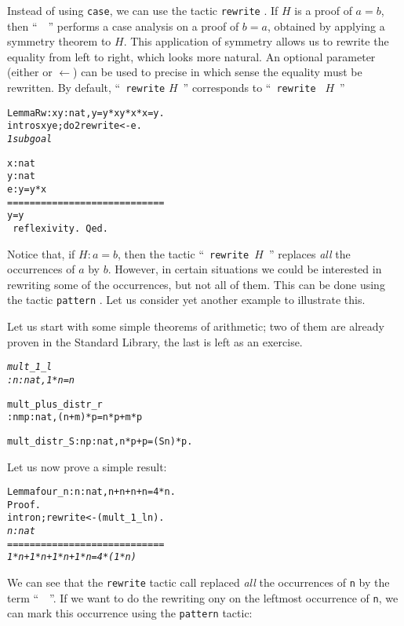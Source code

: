 \documentclass[11pt]{article}
\newcommand{\refmancite}[1]{{}}
\begin{document}
Instead of using \texttt{case}, we can use the tactic 
\texttt{rewrite} \refmancite{Section \ref{Rewrite}}.  If $H$ is a proof
of  $a=b$, then
``~~''
 performs a case analysis on a proof of $b=a$, obtained by applying a
symmetry theorem to $H$. This application of symmetry allows us to rewrite
the equality from left to right, which looks more natural. An optional
parameter (either \texttt{\arrow{}} or \texttt{$\leftarrow$}) can be used to precise
in which sense the equality must be rewritten.  By default,
``~\texttt{rewrite} $H$~'' corresponds to ``~\texttt{rewrite \arrow{}} $H$~''
\begin{alltt}
Lemma Rw :  {\prodsym} x y: nat, y = y * x {\arrow} y * x * x = y.
 intros x y e; do 2 rewrite <- e.
\it
1 subgoal
  
  x : nat
  y : nat
  e : y = y * x
  ============================
   y = y
\tt
 reflexivity.
Qed.
\end{alltt}

Notice that, if $H:a=b$, then the tactic ``~\texttt{rewrite $H$}~''
 replaces \textsl{all} the
occurrences of $a$ by $b$. However, in certain situations we could be
interested in rewriting some of the occurrences, but not all of them.
This can be done using the tactic \texttt{pattern} \refmancite{Section
\ref{Pattern}}.  Let us consider yet another example to
illustrate this.

Let us start with some simple theorems of arithmetic; two of them 
are already proven in the Standard Library, the last is left as an exercise.

\begin{alltt}
\it
mult_1_l
     : {\prodsym} n : nat, 1 * n = n

mult_plus_distr_r
     : {\prodsym} n m p : nat, (n + m) * p = n * p + m * p

mult_distr_S : {\prodsym} n p : nat, n * p + p = (S n)* p.
\end{alltt}

Let us now prove a simple result:

\begin{alltt}
Lemma four_n : {\prodsym} n:nat, n+n+n+n = 4*n.
Proof.
 intro n;rewrite <- (mult_1_l n).
\it
  n : nat
  ============================
   1 * n + 1 * n + 1 * n + 1 * n = 4 * (1 * n)
\end{alltt}

We can see that the \texttt{rewrite} tactic call replaced \emph{all}
the occurrences of \texttt{n} by the term ``~~''.
If we want to do the rewriting ony on the leftmost occurrence of
\texttt{n}, we can mark this occurrence using the \texttt{pattern}
tactic:
\end{document}
